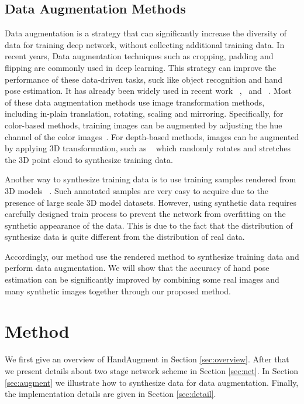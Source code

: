 \documentclass{article}
\begin{document}
\subsection{Data Augmentation Methods}
Data augmentation is a strategy that can significantly increase the diversity of data for training deep network, without collecting additional training data. In recent years, Data augmentation techniques such as cropping, padding and flipping are commonly used in deep learning. This strategy can improve the performance of these data-driven tasks, suck like object recognition and hand pose estimation. It has already been widely used in recent work ~\cite{xiong2019a2j},~\cite{yang2019aligning} and ~\cite{oberweger2017deepprior++}. Most of these data augmentation methods use image transformation methods, including in-plain translation, rotating, scaling and mirroring. 
Specifically, for color-based methods, training images can be augmented by adjusting the hue channel of the color images~\cite{yang2019aligning}. For depth-based methods, images can be augmented by applying 3D transformation, 
such as ~\cite{ge20173d} which randomly rotates and stretches the 3D point cloud to synthesize training data.

Another way to synthesize training data is to use training samples rendered from 3D models ~\cite{hinterstoisser2018pre}. Such annotated samples are very easy to acquire due to the presence of large scale 3D model datasets. However, using synthetic data requires carefully designed train process to prevent the network from overfitting on the synthetic appearance of the data. This is due to the fact that the distribution of synthesize data is quite different from the distribution of real data.

Accordingly, our method use the rendered method to synthesize training data and perform data augmentation. We will show that the accuracy of hand pose estimation can be significantly improved by combining some real images and many synthetic images together through our proposed method. 
\section{Method}
We first give an overview of HandAugment in Section \ref{sec:overview}. After that we present details about two stage network scheme in Section \ref{sec:net}. In Section \ref{sec:augment} we illustrate how to synthesize data for data augmentation. Finally, the implementation details are given in Section \ref{sec:detail}.
\end{document}
